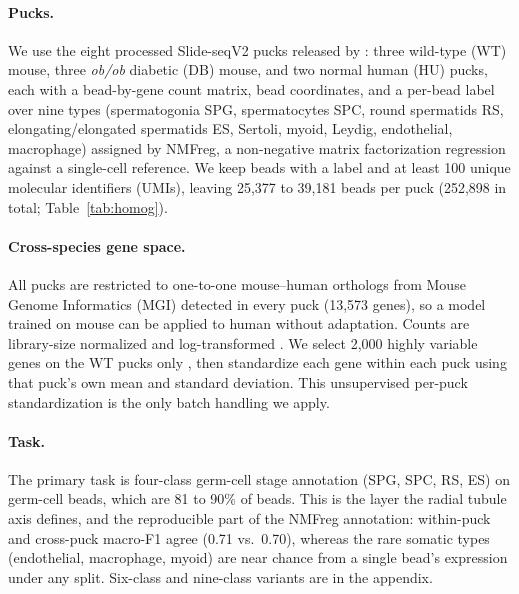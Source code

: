 \paragraph{Pucks.} We use the eight processed Slide-seqV2 pucks released by \citet{chen2021dissecting}: three wild-type (WT) mouse, three \emph{ob/ob} diabetic (DB) mouse, and two normal human (HU) pucks, each with a bead-by-gene count matrix, bead coordinates, and a per-bead label over nine types (spermatogonia SPG, spermatocytes SPC, round spermatids RS, elongating/elongated spermatids ES, Sertoli, myoid, Leydig, endothelial, macrophage) assigned by NMFreg, a non-negative matrix factorization regression against a single-cell reference. We keep beads with a label and at least 100 unique molecular identifiers (UMIs), leaving 25,377 to 39,181 beads per puck (252,898 in total; Table~\ref{tab:homog}).

\paragraph{Cross-species gene space.} All pucks are restricted to one-to-one mouse--human orthologs from Mouse Genome Informatics (MGI) \citep{baldarelli2024mouse} detected in every puck (13,573 genes), so a model trained on mouse can be applied to human without adaptation. Counts are library-size normalized and log-transformed \citep{wolf2018scanpy}. We select 2,000 highly variable genes on the WT pucks only \citep{stuart2019comprehensive}, then standardize each gene within each puck using that puck's own mean and standard deviation. This unsupervised per-puck standardization is the only batch handling we apply.

\paragraph{Task.} The primary task is four-class germ-cell stage annotation (SPG, SPC, RS, ES) on germ-cell beads, which are 81 to 90\% of beads. This is the layer the radial tubule axis defines, and the reproducible part of the NMFreg annotation: within-puck and cross-puck macro-F1 agree (0.71 vs.\ 0.70), whereas the rare somatic types (endothelial, macrophage, myoid) are near chance from a single bead's expression under any split. Six-class and nine-class variants are in the appendix.

